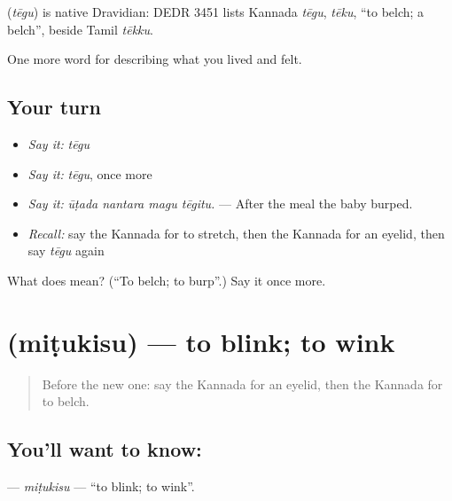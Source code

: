 \begin{cousinweb}
\textbf{} (\emph{tēgu}) is native Dravidian: DEDR 3451 lists Kannada \emph{tēgu}, \emph{tēku}, \textquotedblleft{}to belch; a belch\textquotedblright{}, beside Tamil \emph{tēkku}.
\end{cousinweb}

\begin{grammarlens}[title={What you've built}]
One more word for describing what you lived and felt.
\end{grammarlens}

\subsection*{Your turn}
\begin{itemize}
\raggedright
  \item \emph{Say it:} \emph{tēgu}
  \item \emph{Say it:} \emph{tēgu}, once more
  \item \emph{Say it:} \emph{ūṭada nantara magu tēgitu.} — After the meal the baby burped.
  \item \emph{Recall:} say the Kannada for to stretch, then the Kannada for an eyelid, then say \emph{tēgu} again
\end{itemize}

\begin{tcolorbox}[breakable,colback=teal!4,colframe=teal!35!black,title={Before you move on}]
What does  mean? (\textquotedblleft{}To belch; to burp\textquotedblright{}.) Say it once more.
\end{tcolorbox}
\section[\texorpdfstring{\kn{ಮಿಟುಕಿಸು} (miṭukisu)}{ಮಿಟುಕಿಸು (miṭukisu)}]{ (miṭukisu) — to blink; to wink}

\label{lesson:KA-C507-mitukisu}



\begin{quote}
Before the new one: say the Kannada for an eyelid, then the Kannada for to belch.
\end{quote}

\subsection*{You'll want to know: }
\textbf{} — \emph{miṭukisu} — \textquotedblleft{}to blink; to wink\textquotedblright{}.

